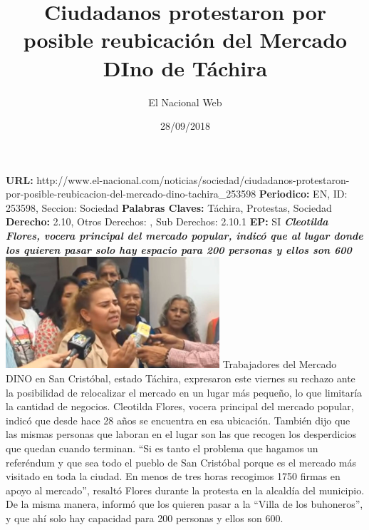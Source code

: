 \documentclass{article}%
\title{\textbf{Ciudadanos protestaron por posible reubicación del Mercado DIno de Táchira}}%
\author{El Nacional Web}%
\date{28/09/2018}%
\begin{document}
%
\normalsize%
\maketitle%
\textbf{URL: }%
http://www.el{-}nacional.com/noticias/sociedad/ciudadanos{-}protestaron{-}por{-}posible{-}reubicacion{-}del{-}mercado{-}dino{-}tachira\_253598\newline%
%
\textbf{Periodico: }%
EN, %
ID: %
253598, %
Seccion: %
Sociedad\newline%
%
\textbf{Palabras Claves: }%
Táchira, Protestas, Sociedad\newline%
%
\textbf{Derecho: }%
2.10, %
Otros Derechos: %
, %
Sub Derechos: %
2.10.1\newline%
%
\textbf{EP: }%
SI\newline%
\newline%
%
\textbf{\textit{Cleotilda Flores, vocera principal del mercado popular, indicó que al lugar donde los quieren pasar solo hay espacio para 200 personas y ellos son 600}}%
\newline%
\newline%
%
\includegraphics[width=300px]{250.jpg}%
\newline%
%
Trabajadores del Mercado DINO en San Cristóbal, estado Táchira, expresaron este viernes su rechazo ante la posibilidad de relocalizar el mercado en un lugar más pequeño, lo que limitaría la cantidad de negocios.%
\newline%
%
Cleotilda Flores, vocera principal del mercado popular, indicó que desde hace 28 años se encuentra en esa ubicación. También dijo que las mismas personas que laboran en el lugar son las que recogen los desperdicios que quedan cuando terminan.%
\newline%
%
“Si es tanto el problema que hagamos un referéndum y que sea todo el pueblo de San Cristóbal porque es el mercado más visitado en toda la ciudad. En menos de tres horas recogimos 1750 firmas en apoyo al mercado”, resaltó Flores durante la protesta en la alcaldía del municipio.%
\newline%
%
De la misma manera, informó que los quieren pasar a la “Villa de los buhoneros”, y que ahí solo hay capacidad para 200 personas y ellos son 600.%
\newline%
%
\end{document}
